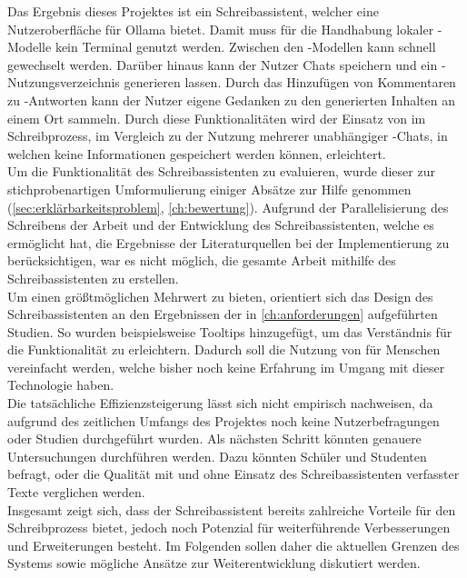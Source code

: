 \documentclass[../main.tex]{subfiles}
\begin{document}
Das Ergebnis dieses Projektes ist ein Schreibassistent, welcher eine Nutzeroberfläche für Ollama bietet. Damit muss für die Handhabung lokaler -Modelle kein Terminal genutzt werden. 
Zwischen den -Modellen kann schnell gewechselt werden. Darüber hinaus kann der Nutzer Chats speichern und ein -Nutzungsverzeichnis generieren lassen. Durch das Hinzufügen von Kommentaren 
zu -Antworten kann der Nutzer eigene Gedanken zu den generierten Inhalten an einem Ort sammeln. Durch diese Funktionalitäten wird der Einsatz von  im Schreibprozess, im Vergleich 
zu der Nutzung mehrerer unabhängiger -Chats, in welchen keine Informationen gespeichert werden können, erleichtert.\\ 
Um die Funktionalität des Schreibassistenten zu evaluieren, wurde dieser zur stichprobenartigen Umformulierung einiger Absätze zur Hilfe genommen (\autoref{sec:erklärbarkeitsproblem}, \autoref{ch:bewertung}). Aufgrund der Parallelisierung des Schreibens der Arbeit und der Entwicklung des Schreibassistenten, welche es ermöglicht hat, die Ergebnisse der Literaturquellen bei der 
Implementierung zu berücksichtigen, war es nicht möglich, die gesamte Arbeit mithilfe des Schreibassistenten zu erstellen. \\
Um einen größtmöglichen Mehrwert zu bieten, orientiert sich das Design des Schreibassistenten an den Ergebnissen der in \autoref{ch:anforderungen} aufgeführten Studien. So wurden beispielsweise 
Tooltips hinzugefügt, um das Verständnis für die Funktionalität zu erleichtern. Dadurch soll die Nutzung von  für Menschen vereinfacht werden, welche bisher noch keine Erfahrung im 
Umgang mit dieser Technologie haben.\\
Die tatsächliche Effizienzsteigerung lässt sich nicht empirisch nachweisen, da aufgrund des zeitlichen Umfangs des Projektes noch keine Nutzerbefragungen oder Studien durchgeführt 
wurden. Als nächsten Schritt könnten genauere Untersuchungen durchführen werden. Dazu könnten Schüler und Studenten befragt, oder die Qualität mit und ohne 
Einsatz des Schreibassistenten verfasster Texte verglichen werden.\\ 
Insgesamt zeigt sich, dass der Schreibassistent bereits zahlreiche Vorteile für den Schreibprozess bietet, jedoch noch Potenzial für weiterführende Verbesserungen und Erweiterungen 
besteht. Im Folgenden sollen daher die aktuellen Grenzen des Systems sowie mögliche Ansätze zur Weiterentwicklung diskutiert werden.\\
\end{document}
